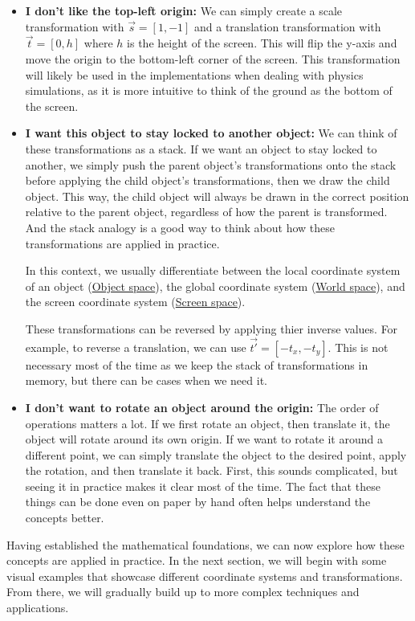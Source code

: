 \begin{itemize}
    \item \textbf{I don't like the top-left origin: } We can simply create a scale transformation with \(\vec{s} = [1, -1]\) and a translation transformation with \(\vec{t} = [0, h]\) where \(h\) is the height of the screen. This will flip the y-axis and move the origin to the bottom-left corner of the screen. This transformation will likely be used in the implementations when dealing with physics simulations, as it is more intuitive to think of the ground as the bottom of the screen.

    \item \textbf{I want this object to stay locked to another object: } We can think of these transformations as a stack. If we want an object to stay locked to another, we simply push the parent object's transformations onto the stack before applying the child object's transformations, then we draw the child object. This way, the child object will always be drawn in the correct position relative to the parent object, regardless of how the parent is transformed. And the stack analogy is a good way to think about how these transformations are applied in practice. 

    \begin{Note} In this context, we usually differentiate between the local coordinate system of an object (\underline{Object space}), the global coordinate system (\underline{World space}), and the screen coordinate system (\underline{Screen space}).
    \end{Note}

    \begin{Note} These transformations can be reversed by applying thier inverse values. For example, to reverse a translation, we can use \(\vec{t'} = [-t_x, -t_y]\). This is not necessary most of the time as we keep the stack of transformations in memory, but there can be cases when we need it.
    \end{Note}

    \item \textbf{I don't want to rotate an object around the origin: } The order of operations matters a lot. If we first rotate an object, then translate it, the object will rotate around its own origin. If we want to rotate it around a different point, we can simply translate the object to the desired point, apply the rotation, and then translate it back. First, this sounds complicated, but seeing it in practice makes it clear most of the time. The fact that these things can be done even on paper by hand often helps understand the concepts better.
\end{itemize}

\pagebreak

Having established the mathematical foundations, we can now explore how these concepts are applied in practice. In the next section, we will begin with some visual examples that showcase different coordinate systems and transformations. From there, we will gradually build up to more complex techniques and applications.
